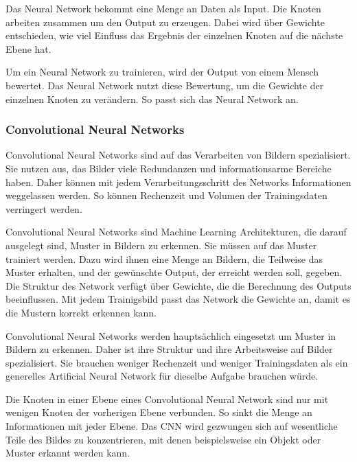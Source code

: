 Das Neural Network bekommt eine Menge an Daten als Input. Die Knoten arbeiten zusammen um den Output zu erzeugen. Dabei wird über Gewichte entschieden, wie viel Einfluss das Ergebnis der einzelnen Knoten auf die nächste Ebene hat.\citep{introToCNN,surveyOfDeepLearing}

Um ein Neural Network zu trainieren, wird der Output von einem Mensch bewertet. Das Neural Network nutzt diese Bewertung, um die Gewichte der einzelnen Knoten zu verändern. So passt sich das Neural Network an. \citep{introToCNN,surveyOfDeepLearing}

\subsubsection{Convolutional Neural Networks}
Convolutional Neural Networks sind auf das Verarbeiten von Bildern spezialisiert. Sie nutzen aus, das Bilder viele Redundanzen und informationsarme Bereiche haben. Daher können mit jedem Verarbeitungsschritt des Networks Informationen weggelassen werden. So können Rechenzeit und Volumen der Trainingsdaten verringert werden.\citep{introToCNN,surveyOfDeepLearing,cNNforClass}

Convolutional Neural Networks sind Machine Learning Architekturen, die darauf ausgelegt sind, Muster in Bildern zu erkennen. Sie müssen auf das Muster trainiert werden. Dazu wird ihnen eine Menge an Bildern, die Teilweise das Muster erhalten, und der gewünschte Output, der erreicht werden soll, gegeben. Die Struktur des Network verfügt über Gewichte, die die Berechnung des Outputs beeinflussen. Mit jedem Trainigsbild passt das Network die Gewichte an, damit es die Mustern korrekt erkennen kann.\citep{introToCNN,surveyOfDeepLearing}

Convolutional Neural Networks werden hauptsächlich eingesetzt um Muster in Bildern zu erkennen. Daher ist ihre Struktur und ihre Arbeitsweise auf Bilder spezialisiert. Sie brauchen weniger Rechenzeit und weniger Trainingsdaten als ein generelles Artificial Neural Network für dieselbe Aufgabe brauchen würde.\citep{introToCNN,surveyOfDeepLearing,cNNforClass} 

Die Knoten in einer Ebene eines Convolutional Neural Network sind nur mit wenigen Knoten der vorherigen Ebene verbunden. So sinkt die Menge an Informationen mit jeder Ebene. Das CNN wird gezwungen sich auf wesentliche Teile des Bildes zu konzentrieren, mit denen beispielsweise ein Objekt oder  Muster erkannt werden kann. \citep{introToCNN,surveyOfDeepLearing}

